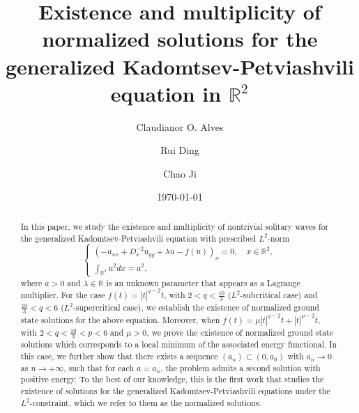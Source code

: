 \documentclass[11pt]{amsart}
\title[The generalized Kadomtsev-Petviashvili equation]{Existence and multiplicity of normalized solutions for the generalized Kadomtsev-Petviashvili equation in $\mathbb{R}^2$}
\author[C.O. Alves]{Claudianor O. Alves}
\author[R. Ding]{Rui Ding}
\author[C. Ji]{Chao Ji}
\date{\today}
\numberwithin{equation}{section}
\begin{document}
\maketitle

    \begin{abstract}
        In this paper, we study the existence and {multiplicity} of nontrivial solitary waves for the generalized Kadomtsev-Petviashvili equation with prescribed {$L^2$-norm}
\begin{equation*}\label{Equation1}
    \left\{\begin{array}{l}
        \left(-u_{x x}+D_x^{-2} u_{y y}+\lambda u-f(u)\right)_x=0,{\quad x \in \mathbb{R}^2, } \\[10pt]
    \displaystyle   \int_{\mathbb{R}^2}u^2 d x=a^2,
    \end{array}\right.%
\end{equation*}
where  $a>0$ and  $\lambda \in \mathbb{R}$ is an unknown parameter that appears as a Lagrange multiplier. For the case $f(t)=|t|^{q-2}t$, with $2<q<\frac{10}{3}$ ($L^2$-subcritical case) and $\frac{10}{3}<q<6$ ($L^2$-supercritical case), we establish the existence of normalized ground state solutions for the above equation. Moreover, when $f(t)=\mu|t|^{q-2}t+|t|^{p-2}t$, with $2<q<\frac{10}{3}<p<6$ and $\mu>0$,
we prove the existence of normalized ground state solutions  which corresponds to a local minimum of the associated energy
functional. In this case, we further show that there exists a sequence $(a_n) \subset (0,a_0)$ with $a_n \to 0$ as $n \to+\infty$, such that for each $a=a_n$, the problem admits a second solution with positive energy.  To the best of our knowledge, this is the first work that studies the existence of solutions for the generalized Kadomtsev-Petviashvili equations under the $L^2$-constraint, which we refer to them as the normalized solutions.
\end{abstract}
\thispagestyle{empty}


\noindent
\end{document}

